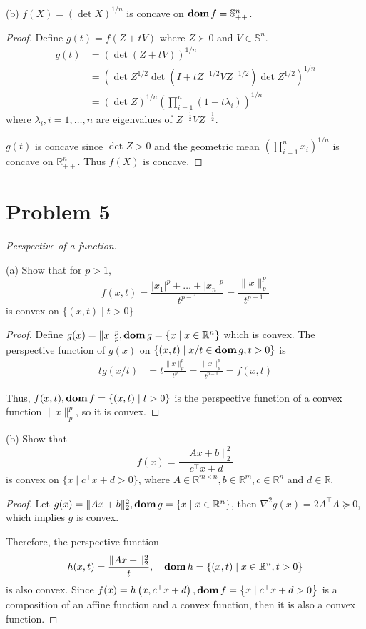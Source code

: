 \documentclass[11pt]{article}
\newcommand{\RR}{\mathbb{R}}
\newcommand{\bS}{\mathbb{S}}
\newcommand{\half}{\frac{1}{2}}
\newcommand{\T}{^\top}
\begin{document}
(b) $f(X) = (\det X)^{1/n}$ is concave on $\dom f = \bS^n_{++}$.
\begin{proof}
  Define $g(t) = f(Z+tV)$ where $Z\succ 0$ and $V\in\bS^n$.
  \begin{align*}
    g(t) & =(\det(Z+t V))^{1 / n} \\
    & =\left(\det Z^{1 / 2} \det\left(I+t Z^{-1 / 2} V Z^{-1 / 2}\right) \det Z^{1 / 2}\right)^{1 / n} \\
    & =(\det Z)^{1 / n}\left(\prod_{i=1}^n\left(1+t \lambda_i\right)\right)^{1 / n}
  \end{align*}
  where $\lambda_i, i=1, \dots, n$ are eigenvalues of $Z^{-\half} V Z^{-\half}$.

  $g(t)$ is concave since $\det Z > 0$ and the geometric mean $\left(\prod_{i=1}^{n}x_i\right)^{1/n}$ is concave on $\RR^n_{++}$. Thus $f(X)$ is concave.
\end{proof}


\clearpage
\section*{Problem 5}
\textit{Perspective of a function}.

(a) Show that for $p>1$,
\[
f(x, t) = \frac{|x_1|^p + \dots + |x_n|^p}{t^{p-1}} = \frac{\|x\|^p_p}{t^{p-1}}
\]
is convex on $\{(x, t)\mid t>0\}$

\begin{proof}
  Define $g(x) = \|x\|^p_p, \dom g=\{x\mid x\in \RR^n\}$ which is convex. The perspective function of $g(x)$ on $\{(x, t)\mid x/t\in\mathop{\textbf{dom}} g, t>0\}$ is
  \begin{align*}
    tg(x/t) &= t\frac{\|x\|^p_p}{t^p} = \frac{\|x\|^p_p}{t^{p-1}} = f(x, t)
  \end{align*}
  
  Thus, $f(x, t), \mathop{\textbf{dom}} f=\{(x, t)\mid t>0\}$ is the perspective function of a convex function $\|x\|^p_p$, so it is convex.
\end{proof}


(b) Show that
\[
f(x) = \frac{\|Ax+b\|^2_2}{c\T x+d}
\]
is convex on $\{x\mid c\T x+d > 0\}$, where $A\in \RR^{m\times n}, b\in \RR^m, c\in\RR^n$ and $d\in \RR$.

\begin{proof}
  Let $g(x)=\|A x+b\|_2^2, \dom g=\{x\mid x\in \RR^n\}$, then $\nabla^2 g(x)=2 A^{\top} A \succeq 0$, which implies $g$ is convex.
  
  Therefore, the perspective function
  $$
  h(x, t)=\frac{\|A x+\|_2^2}{t}, \quad \mathop{\textbf{dom}} h=\left\{(x, t) \mid x \in \mathbb{R}^n, t>0\right\}
  $$  
  is also convex.
  Since $f(x)=h\left(x, c^{\top} x+d\right), \mathop{\textbf{dom}} f=\left\{x \mid c^{\top} x+d>0\right\}$ is a composition of an affine function and a convex function, then it is also a convex function.
\end{proof}
\end{document}
